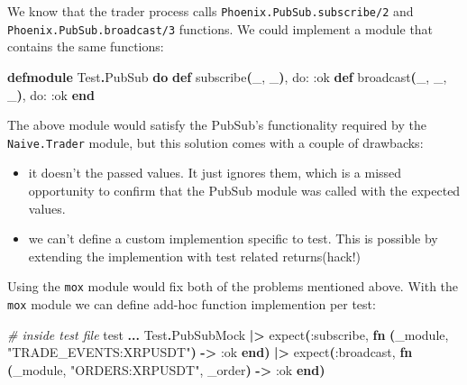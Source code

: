 \documentclass[
  oneside]{book}
\newenvironment{Shaded}{\begin{snugshade}}{\end{snugshade}}
\newcommand{\CommentTok}[1]{\textcolor[rgb]{0.56,0.35,0.01}{\textit{#1}}}
\newcommand{\ConstantTok}[1]{\textcolor[rgb]{0.56,0.35,0.01}{#1}}
\newcommand{\FunctionTok}[1]{\textcolor[rgb]{0.13,0.29,0.53}{\textbf{#1}}}
\newcommand{\KeywordTok}[1]{\textcolor[rgb]{0.13,0.29,0.53}{\textbf{#1}}}
\newcommand{\NormalTok}[1]{#1}
\newcommand{\OperatorTok}[1]{\textcolor[rgb]{0.81,0.36,0.00}{\textbf{#1}}}
\newcommand{\StringTok}[1]{\textcolor[rgb]{0.31,0.60,0.02}{#1}}
\newcommand{\VariableTok}[1]{\textcolor[rgb]{0.00,0.00,0.00}{#1}}
\providecommand{\tightlist}{%
  \setlength{\itemsep}{0pt}\setlength{\parskip}{0pt}}
\begin{document}
We know that the trader process calls \texttt{Phoenix.PubSub.subscribe/2} and \texttt{Phoenix.PubSub.broadcast/3} functions. We could implement a module that contains the same functions:

\begin{Shaded}
\begin{Highlighting}[]
\KeywordTok{defmodule} \ConstantTok{Test}\OperatorTok{.}\ConstantTok{PubSub} \KeywordTok{do}
    \KeywordTok{def}\NormalTok{ subscribe}\FunctionTok{(}\NormalTok{\_, \_}\FunctionTok{)}\NormalTok{, }\VariableTok{do:} \VariableTok{:ok}
    \KeywordTok{def}\NormalTok{ broadcast}\FunctionTok{(}\NormalTok{\_, \_, \_}\FunctionTok{)}\NormalTok{, }\VariableTok{do:} \VariableTok{:ok}
\KeywordTok{end}
\end{Highlighting}
\end{Shaded}

The above module would satisfy the PubSub's functionality required by the \texttt{Naive.Trader} module, but this solution comes with a couple of drawbacks:

\begin{itemize}
\tightlist
\item
  it doesn't the passed values. It just ignores them, which is a missed opportunity to confirm that the PubSub module was called with the expected values.
\item
  we can't define a custom implemention specific to test. This is possible by extending the implemention with test related returns(hack!)
\end{itemize}

Using the \texttt{mox} module would fix both of the problems mentioned above. With the \texttt{mox} module we can define add-hoc function implemention per test:

\begin{Shaded}
\begin{Highlighting}[]
    \CommentTok{\# inside test file}
\NormalTok{    test }\OperatorTok{...}
        \ConstantTok{Test}\OperatorTok{.}\ConstantTok{PubSubMock}
        \OperatorTok{|\textgreater{}}\NormalTok{ expect}\FunctionTok{(}\VariableTok{:subscribe}\NormalTok{, }\KeywordTok{fn} \FunctionTok{(}\NormalTok{\_module, }\StringTok{"TRADE\_EVENTS:XRPUSDT"}\FunctionTok{)} \OperatorTok{{-}\textgreater{}} \VariableTok{:ok} \KeywordTok{end}\FunctionTok{)}
        \OperatorTok{|\textgreater{}}\NormalTok{ expect}\FunctionTok{(}\VariableTok{:broadcast}\NormalTok{, }\KeywordTok{fn} \FunctionTok{(}\NormalTok{\_module, }\StringTok{"ORDERS:XRPUSDT"}\NormalTok{, \_order}\FunctionTok{)} \OperatorTok{{-}\textgreater{}} \VariableTok{:ok} \KeywordTok{end}\FunctionTok{)}
\end{Highlighting}
\end{Shaded}
\end{document}
